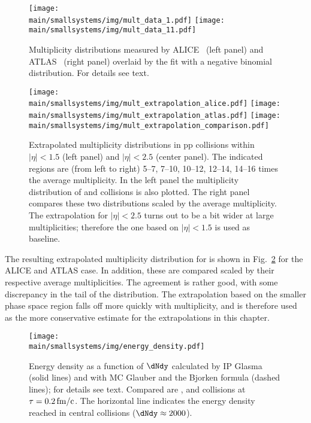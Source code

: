 \documentclass[../report.tex]{subfiles}
\providecommand{\main}{..}
\begin{document}
\begin{figure}[t]
\centering
\texttt{[image: \\main/smallsystems/img/mult\_data\_1.pdf]}
\hfill
\texttt{[image: \\main/smallsystems/img/mult\_data\_11.pdf]}
\caption{Multiplicity distributions measured by ALICE~\cite{Adam:2015gka} (left panel) and ATLAS~\cite{Aad:2010ac,Aad:2016xww} (right panel) overlaid by the fit with a negative binomial distribution. For details see text.}
\label{fig:smallsystems_mult_data}
\end{figure}

\begin{figure}[t]
\centering
\texttt{[image: \\main/smallsystems/img/mult\_extrapolation\_alice.pdf]}
\texttt{[image: \\main/smallsystems/img/mult\_extrapolation\_atlas.pdf]}
\texttt{[image: \\main/smallsystems/img/mult\_extrapolation\_comparison.pdf]}
\caption{Extrapolated multiplicity distributions in pp collisions within $|\eta| < 1.5$ (left panel) and $|\eta| < 2.5$ (center panel). The indicated regions are (from left to right) 5--7, 7--10, 10--12, 12--14, 14--16 times the average multiplicity. In the left panel the multiplicity distribution of \PbPb and \pPb collisions is also plotted. The right panel compares these two distributions scaled by the average multiplicity. The extrapolation for $|\eta| < 2.5$ turns out to be a bit wider at large multiplicities; therefore the one based on $|\eta| < 1.5$ is used as baseline.}
\label{fig:smallsystems_mult_extrapolation}
\end{figure}

The resulting extrapolated multiplicity distribution for \unit[14]{\UTeV} is shown in Fig.~\ref{fig:smallsystems_mult_extrapolation} for the ALICE and ATLAS case. In addition, these are compared scaled by their respective average multiplicities. The agreement is rather good, with some discrepancy in the tail of the distribution. The extrapolation based on the smaller phase space region falls off more quickly with multiplicity, and is therefore used as the more conservative estimate for the extrapolations in this chapter.

\begin{figure}[t]
\centering
\texttt{[image: \\main/smallsystems/img/energy\_density.pdf]}
\caption{Energy density as a function of $\dNdy$ calculated by IP Glasma (solid lines) and with MC Glauber and the Bjorken formula (dashed lines); for details see text. Compared are \pp, \pPb and \PbPb collisions at $\tau = \unit[0.2]{fm/c}$. The horizontal line indicates the energy density reached in central \PbPb collisions ($\dNdy \approx 2000$).}
\label{fig:energy_density}
\end{figure}
\end{document}
